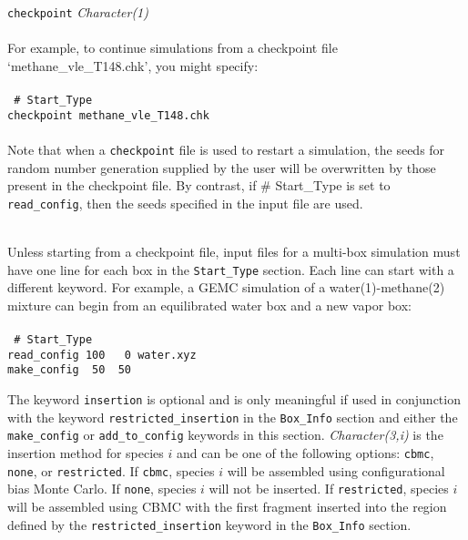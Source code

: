\begin{itemize}
{\tt checkpoint} {\it Character(1)} \\ \\
%
For example, to continue simulations from a checkpoint file `methane\_vle\_T148.chk', you might specify: \\ \\
%
\texttt{
\# Start\_Type \\
checkpoint methane\_vle\_T148.chk \\ } \\
%
Note that when a {\tt checkpoint} file is used to restart a simulation, the seeds for random number generation supplied by the user
will be overwritten by those present in the checkpoint file. By contrast, if \# Start\_Type is set to {\tt read\_config},
then the seeds specified in the input file are used.  \\ \\
%
\end{itemize}
Unless starting from a checkpoint file, input files for a multi-box simulation must have one line for each box in the \texttt{Start\_Type} section. Each line can start with a different keyword. For example, a GEMC simulation of a water(1)-methane(2) mixture can begin from an equilibrated water box and a new vapor box: \\ \\
%
\texttt{
\# Start\_Type \\
read\_config 100 \ \ 0 water.xyz \\
make\_config \ 50 \ 50 \\}

The keyword {\tt insertion} is optional and is only meaningful if used in conjunction
with the keyword {\tt restricted\_insertion} in the {\tt Box\_Info} section and
either the {\tt make\_config} or {\tt add\_to\_config} keywords in this section.
{\it Character(3,i)} is the insertion method for species $i$ and can be one of the following options:
{\tt cbmc}, {\tt none}, or {\tt restricted}.
If {\tt cbmc}, species $i$ will be assembled using configurational bias Monte Carlo.
If {\tt none}, species $i$ will not be inserted.
If \texttt{restricted}, species $i$ will be assembled using CBMC
with the first fragment inserted into the region defined by
the \texttt{restricted\_insertion} keyword in the \texttt{Box\_Info} section. \\
%
%
%
